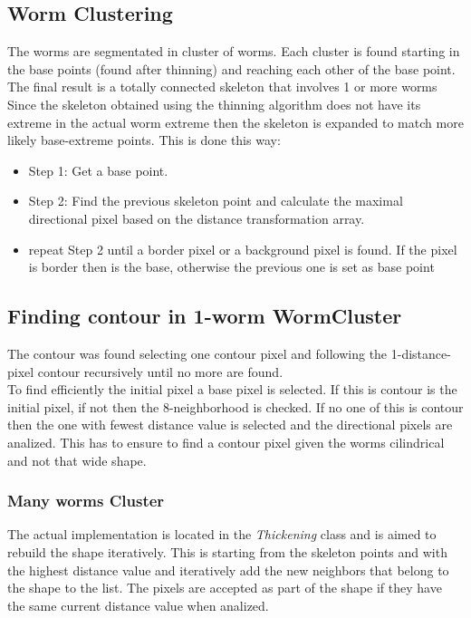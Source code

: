 \documentclass{article}
\begin{document}
\subsection{Worm Clustering}
The worms are segmentated in cluster of worms. Each cluster is found starting in the base points (found after thinning)
 and reaching each other of the base point. The final result is a totally connected skeleton that involves 1 or more
worms\\

Since the skeleton obtained using the thinning algorithm does not have its extreme in the actual worm extreme then 
the skeleton is expanded to match more likely base-extreme points.
This is done this way:
\begin{itemize}
\item Step 1: Get a base point.
\item Step 2: Find the previous skeleton point and calculate the maximal
  directional pixel based on the distance transformation array.
\item repeat Step 2 until a border pixel or a background pixel is found.
  If the pixel is border then is the base, otherwise the previous one is 
  set as base point
\end{itemize}


\subsection{Finding contour in 1-worm WormCluster}
The contour was found selecting one contour pixel and following the 
1-distance-pixel contour recursively until no more are found.\\
To find efficiently the initial pixel a base pixel is selected. If this
is contour is the initial pixel, if not then the 8-neighborhood is checked.
If no one of this is contour then the one with fewest distance value is selected
and the directional pixels are analized. This has to ensure to find a contour
pixel given the worms cilindrical and not that wide shape.

\subsubsection{Many worms Cluster}
The actual implementation is located in the \emph{Thickening} class and is 
aimed to rebuild the shape iteratively. This is starting from the 
skeleton points and with the highest distance value and iteratively add
the new neighbors that belong to the shape to the list. The pixels are
accepted as part of the shape if they have the same current distance value
when analized. \\
\end{document}
